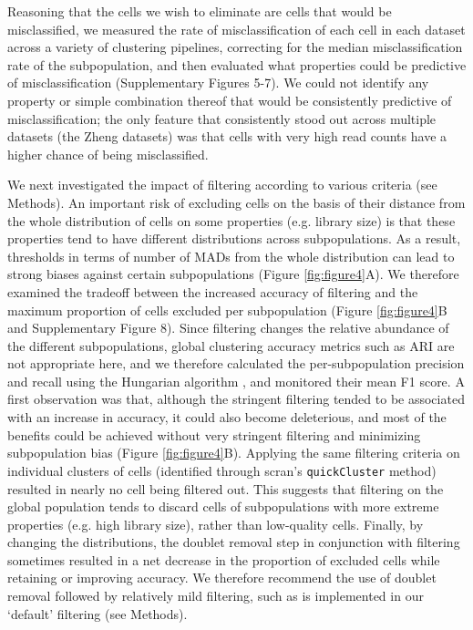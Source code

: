 \documentclass{bmcart}
\begin{document}
Reasoning that the cells we wish to eliminate are cells that would be misclassified, we measured the rate of misclassification of each cell in each dataset across a variety of clustering pipelines, correcting for the median misclassification rate of the subpopulation, and then evaluated what properties could be predictive of misclassification (Supplementary Figures 5-7). We could not identify any property or simple combination thereof that would be consistently predictive of misclassification; the only feature that consistently stood out across multiple datasets (the Zheng datasets) was that cells with very high read counts have a higher chance of being misclassified.

We next investigated the impact of filtering according to various criteria (see Methods). An important risk of excluding cells on the basis of their distance from the whole distribution of cells on some properties (e.g. library size) is that these properties tend to have different distributions across subpopulations. As a result, thresholds in terms of number of MADs from the whole distribution can lead to strong biases against certain subpopulations (Figure \ref{fig:figure4}A). We therefore examined the tradeoff between the increased accuracy of filtering and the maximum proportion of cells excluded per subpopulation (Figure \ref{fig:figure4}B and Supplementary Figure 8). Since filtering changes the relative abundance of the different subpopulations, global clustering accuracy metrics such as ARI are not appropriate here, and we therefore calculated the per-subpopulation precision and recall using the Hungarian algorithm \citep{PapadimitriouHu1998}, and monitored their mean F1 score. A first observation was that, although the stringent filtering tended to be associated with an increase in accuracy, it could also become deleterious, and most of the benefits could be achieved without very stringent filtering and minimizing subpopulation bias (Figure \ref{fig:figure4}B). Applying the same filtering criteria on individual clusters of cells (identified through scran's \texttt{quickCluster} method) resulted in nearly no cell being filtered out. This suggests that filtering on the global population tends to discard cells of subpopulations with more extreme properties (e.g. high library size), rather than low-quality cells. Finally, by changing the distributions, the doublet removal step in conjunction with filtering sometimes resulted in a net decrease in the proportion of excluded cells while retaining or improving accuracy. We therefore recommend the use of doublet removal followed by relatively mild filtering, such as is implemented in our `default' filtering (see Methods).
\end{document}

